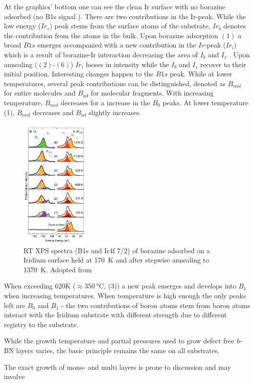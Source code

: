 At the graphics' bottom one can see the clean Ir surface with no borazine adsorbed (no B1s signal ). There are two contributions in the Ir-peak. While the low energy ($Ir_s$) peak stems from the surface atoms of the substrate, $Ir_b$ denotes the contribution from the atoms in the bulk. Upon borazine adsorption $(1)$ a broad $B1s$ emerges accompanied with a new contribution in the $Ir$-peak ($Ir_i$) which is a result of borazine-Ir interaction decreasing the area of $I_b$ and $I_s$ .
Upon annealing ($(2)$-$(6)$) $Ir_i$ looses in intensity while the $I_b$ and $I_s$ recover to their initial position. Interesting changes happen to the $B1s$ peak. While at lower temperatures, several peak contributions can be distinguished, denoted as $B_{mol}$ for entire molecules and $B_{ad}$ for molecular fragments. With increasing temperature, $B_{mol}$ decreases for a increase in the $B_0$ peaks. At lower temperature (1), $B_{mol}$ decreases and $B_{ad}$ slightly increases. 
\begin{figure}\centering
	\includegraphics[width=0.3\textwidth]{./images/07571n_fig5.png}
	\caption{RT XPS spectra (B1s and Ir4f 7/2) of borazine adsorbed on a Iridium surface held at \SI{170}{\kelvin} and after stepwise annealing to \SI{1370}{\kelvin}. Adopted from \cite{orlando_epitaxial_2012}}
	\label{fig:borazine-TPG-on-Ir}
\end{figure}
When exceeding 620K ($\approx \SI{350}{\celsius}$, (3)) a new peak emerges and develops into $B_1$ when increasing temperatures. When temperature is high enough the only peaks left are $B_0$ and $B_1$ - the two contributions of boron atoms stem from boron atoms interact with the Iridium substrate with different strength due to different registry to the substrate.

While the growth temperature and partial pressures used to grow defect free \textit{h}-BN layers varies, the basic principle remains the same on all substrates.

The exact growth of mono- and multi layers \cite{ismach_toward_2012} is prone to discussion and may involve  
